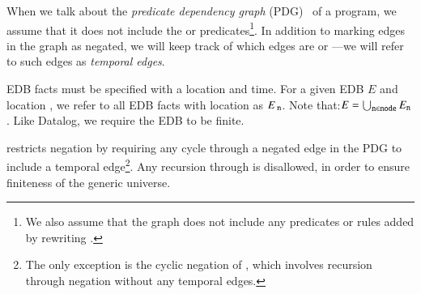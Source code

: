 When we talk about the {\em predicate dependency graph} (PDG)~\cite{ullmanbook} of a \lang program, we assume that it does not include the  or  predicates\footnote{We also assume that the graph does not include any predicates or rules added by rewriting .}.  In addition to marking edges in the graph as negated, we will keep track of which edges are  or ---we will refer to such edges as {\em temporal edges}.

\vspace{1em}
EDB facts must be specified with a location and time.  For a given EDB $E$ and location , we refer to all EDB facts with location  as $E_{\text{ \dedalus{{\scriptsize n}}}}$.  Note that:$E = \bigcup_{\text{\dedalus{{\scriptsize n}}} \in \text{\dedalus{{\scriptsize node}}}} E_{\text{\dedalus{{\scriptsize n}}}}$.  Like Datalog, we require the EDB to be finite.

\vspace{1em}
\lang restricts negation by requiring any cycle through a negated edge in the PDG to include a temporal edge\footnote{The only exception is the cyclic negation of , which involves recursion through negation without any temporal edges.}.  Any recursion through  is disallowed, in order to ensure finiteness of the generic universe.




